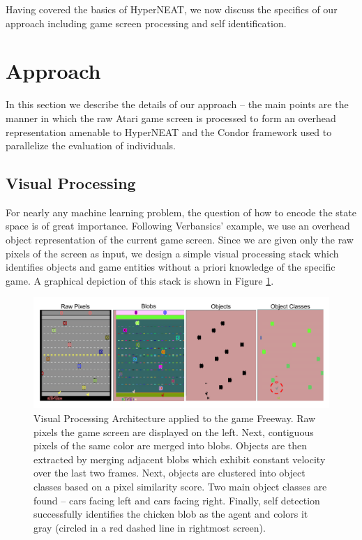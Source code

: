 \documentclass{acm_proc_article-sp}
\begin{document}
Having covered the basics of HyperNEAT, we now discuss the specifics of our approach including game screen processing and self identification.


\section{Approach}
\label{sec:approach}
In this section we describe the details of our approach -- the main points are the manner in which the raw Atari game screen is processed to form an overhead representation amenable to HyperNEAT and the Condor framework used to parallelize the evaluation of individuals.

\subsection{Visual Processing}
For nearly any machine learning problem, the question of how to encode the state space is of great importance. Following Verbansics' example, we use an overhead object representation of the current game screen. Since we are given only the raw pixels of the screen as input, we design a simple visual processing stack which identifies objects and game entities without a priori knowledge of the specific game. A graphical depiction of this stack is shown in Figure \ref{fig:visproc}.

\begin{figure}[htp]
\begin{center}
\includegraphics[width=\textwidth]{figures/AtariArch}
\end{center}
\caption{Visual Processing Architecture applied to the game Freeway. Raw pixels the game screen are displayed on the left. Next, contiguous pixels of the same color are merged into blobs. Objects are then extracted by merging adjacent blobs which exhibit constant velocity over the last two frames. Next, objects are clustered into object classes based on a pixel similarity score. Two main object classes are found -- cars facing left and cars facing right. Finally, self detection successfully identifies the chicken blob as the agent and colors it gray (circled in a red dashed line in rightmost screen).}
\label{fig:visproc}
\end{figure}
\end{document}
